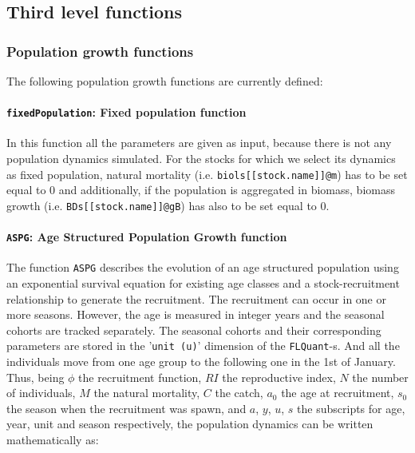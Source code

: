 
\subsection{Third level functions}

\subsubsection{Population growth functions}

  The following population growth functions are currently defined:

\paragraph{\texttt{fixedPopulation}: Fixed population function} \hspace{0pt} \smallskip
		
	In this function all the parameters are given as input, 
  because there is not any population dynamics simulated.
  For the stocks for which we select its dynamics as fixed population, 
  natural mortality (i.e. \texttt{biols[[stock.name]]@m}) has to be set equal to 0 
  and additionally, if the population is aggregated in biomass, biomass growth (i.e. \texttt{BDs[[stock.name]]@gB}) 
  has also to be set equal to 0.


\paragraph{\texttt{ASPG}: Age Structured Population Growth function} \hspace{0pt} \smallskip
		
	The function \texttt{ASPG} describes the evolution of an age structured population using an 
	exponential survival equation for existing age classes and a stock-recruitment 
	relationship to generate the recruitment. The recruitment can occur in one or more seasons.	
	However, the age is measured in integer years and the seasonal cohorts are tracked 
	separately. The seasonal cohorts and their corresponding parameters are stored in 
	the '\texttt{unit (u)}' dimension of the \texttt{FLQuant}-s. And all the individuals 
	move from one age group	to the following one in the 1st of January.  Thus, being
	$\phi$ the recruitment function, $RI$ the reproductive index, 
	$N$ the number of individuals, $M$ the natural mortality,  
	$C$ the catch, $a_0$ the age at recruitment, $s_0$ the season when the recruitment
	was spawn, and $a$, $y$, $u$, $s$ the subscripts for age, year, unit  
	and season respectively, the population dynamics can be written mathematically as:
			

